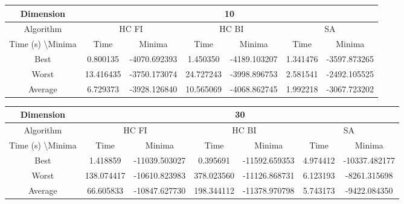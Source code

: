 \documentclass{article}
\begin{document}
\begin{table}[H]
\begin{tabular}{|c|c|c|c|c|c|c|}
\hline
Dimension                      & \multicolumn{6}{c|}{10}                                                           \\ \hline
Algorithm                      & \multicolumn{2}{c|}{HC FI} & \multicolumn{2}{c|}{HC BI} & \multicolumn{2}{c|}{SA} \\ \hline
Time (s) \textbackslash Minima & Time       & Minima        & Time       & Minima        & Time     & Minima       \\ \hline
Best                           & 0.800135   & -4070.692393  & 1.450350   & -4189.103207  & 1.341476 & -3597.873265 \\ \hline
Worst                          & 13.416435  & -3750.173074  & 24.727243  & -3998.896753  & 2.581541 & -2492.105525 \\ \hline
Average                        & 6.729373   & -3928.126840  & 10.565069  & -4068.862745  & 1.992218 & -3067.723202 \\ \hline
\end{tabular}
\end{table} 

\begin{table}[H]
\begin{tabular}{|c|c|c|c|c|c|c|}
\hline
Dimension                      & \multicolumn{6}{c|}{30}                                                            \\ \hline
Algorithm                      & \multicolumn{2}{c|}{HC FI} & \multicolumn{2}{c|}{HC BI} & \multicolumn{2}{c|}{SA}  \\ \hline
Time (s) \textbackslash Minima & Time       & Minima        & Time       & Minima        & Time     & Minima        \\ \hline
Best                           & 1.418859   & -11039.503027 & 0.395691   & -11592.659353 & 4.974412 & -10337.482177 \\ \hline
Worst                          & 138.074417 & -10610.823983 & 378.023560 & -11126.868731 & 6.123193 & -8261.315698  \\ \hline
Average                        & 66.605833  & -10847.627730 & 198.344112 & -11378.970798 & 5.743173 & -9422.084350  \\ \hline
\end{tabular}
\end{table}
 
 \newpage
 
\end{document}
